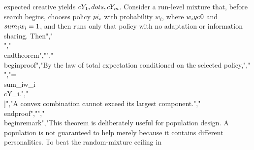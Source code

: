 {{{expected creative yields $\\cY_1,\\dots,\\cY_m$. Consider a run-level mixture that, before search begins, chooses policy $\\pi_i$ with probability $w_i$, where $w_i\\ge 0$ and $\\sum_iw_i=1$, and then runs only that policy with no adaptation or information sharing. Then","\\[","\\cY_{\\mathrm{mix}}=\\sum_{i=1}^m w_i\\cY_i","\\le \\max_i\\cY_i.","\\]","\\end{theorem}","","\\begin{proof}","By the law of total expectation conditioned on the selected policy,","\\[","\\cY_{\\mathrm{mix}}","=\\sum_i w_i\\E[Z\\mid\\pi_i]","=\\sum_iw_i\\cY_i.","\\]","A convex combination cannot exceed its largest component.","\\end{proof}","","\\begin{remark}","This theorem is deliberately useful for population design. A population is not guaranteed to help merely because it contains different personalities. To beat the random-mixture ceiling in }}}
